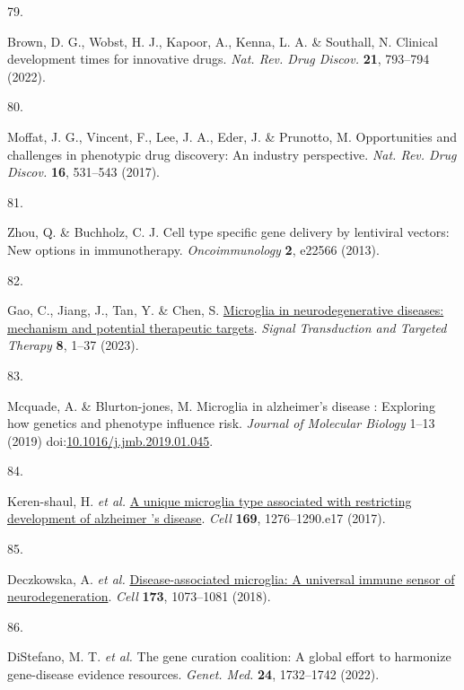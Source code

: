 \documentclass[
]{article}
\newlength{\cslhangindent}
\newlength{\csllabelwidth}
\newenvironment{CSLReferences}[2] %
 {\begin{list}{}{%
  \setlength{\itemindent}{0pt}
  \setlength{\leftmargin}{0pt}
  \setlength{\parsep}{0pt}
  \ifodd #1
   \setlength{\leftmargin}{\cslhangindent}
   \setlength{\itemindent}{-1\cslhangindent}
  \fi
  \setlength{\itemsep}{#2\baselineskip}}}
 {\end{list}}
\newcommand{\CSLLeftMargin}[1]{\parbox[t]{\csllabelwidth}{\strut#1\strut}}
\newcommand{\CSLRightInline}[1]{\parbox[t]{\linewidth - \csllabelwidth}{\strut#1\strut}}
\begin{document}
\begin{CSLReferences}{0}{0}
\CSLLeftMargin{79. }%
\CSLRightInline{Brown, D. G., Wobst, H. J., Kapoor, A., Kenna, L. A. \&
Southall, N. Clinical development times for innovative drugs. \emph{Nat.
Rev. Drug Discov.} \textbf{21}, 793--794 (2022).}

\CSLLeftMargin{80. }%
\CSLRightInline{Moffat, J. G., Vincent, F., Lee, J. A., Eder, J. \&
Prunotto, M. Opportunities and challenges in phenotypic drug discovery:
An industry perspective. \emph{Nat. Rev. Drug Discov.} \textbf{16},
531--543 (2017).}

\CSLLeftMargin{81. }%
\CSLRightInline{Zhou, Q. \& Buchholz, C. J. Cell type specific gene
delivery by lentiviral vectors: New options in immunotherapy.
\emph{Oncoimmunology} \textbf{2}, e22566 (2013).}

\CSLLeftMargin{82. }%
\CSLRightInline{Gao, C., Jiang, J., Tan, Y. \& Chen, S.
\href{https://doi.org/10.1038/s41392-023-01588-0}{Microglia in
neurodegenerative diseases: mechanism and potential therapeutic
targets}. \emph{Signal Transduction and Targeted Therapy} \textbf{8},
1--37 (2023).}

\CSLLeftMargin{83. }%
\CSLRightInline{Mcquade, A. \& Blurton-jones, M. Microglia in
alzheimer's disease : Exploring how genetics and phenotype influence
risk. \emph{Journal of Molecular Biology} 1--13 (2019)
doi:\href{https://doi.org/10.1016/j.jmb.2019.01.045}{10.1016/j.jmb.2019.01.045}.}

\CSLLeftMargin{84. }%
\CSLRightInline{Keren-shaul, H. \emph{et al.}
\href{https://doi.org/10.1016/j.cell.2017.05.018}{A unique microglia
type associated with restricting development of alzheimer 's disease}.
\emph{Cell} \textbf{169}, 1276--1290.e17 (2017).}

\CSLLeftMargin{85. }%
\CSLRightInline{Deczkowska, A. \emph{et al.}
\href{https://doi.org/10.1016/j.cell.2018.05.003}{Disease-associated
microglia: A universal immune sensor of neurodegeneration}. \emph{Cell}
\textbf{173}, 1073--1081 (2018).}

\CSLLeftMargin{86. }%
\CSLRightInline{DiStefano, M. T. \emph{et al.} The gene curation
coalition: A global effort to harmonize gene-disease evidence resources.
\emph{Genet. Med.} \textbf{24}, 1732--1742 (2022).}


\end{CSLReferences}
\end{document}
